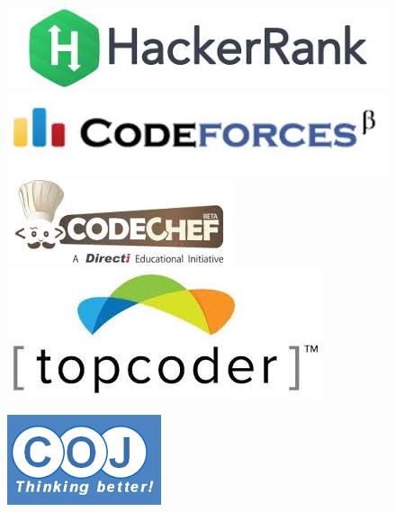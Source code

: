 \documentclass{beamer}
\begin{document}
\begin{frame}
\begin{figure}[!htb]
     \endminipage\hfill
	\end{figure}
	\begin{figure}[!htb]
      \includegraphics[width=\linewidth]{images/judges/hackerrank}%
     \endminipage\hfill
      \includegraphics[width=\linewidth]{images/judges/codeforces}%
     \endminipage\hfill
      \includegraphics[width=\linewidth]{images/judges/codechef}%
     \endminipage\hfill
      \includegraphics[width=\linewidth]{images/judges/topcoder}%
     \endminipage\hfill
	\end{figure}
    \begin{figure}[!htb]
      \includegraphics[width=\linewidth]{images/judges/coj}%

\end{figure}
\end{frame}
\end{document}
